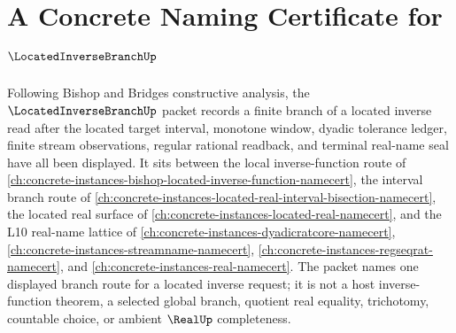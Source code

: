 \chapter{A Concrete Naming Certificate for $\LocatedInverseBranchUp$}
\label{ch:concrete-instances-located-inverse-branch-namecert}

Following Bishop and Bridges constructive analysis, the $\LocatedInverseBranchUp$ packet records a finite branch of a located inverse read after the located target interval, monotone window, dyadic tolerance ledger, finite stream observations, regular rational readback, and terminal real-name seal have all been displayed. It sits between the local inverse-function route of \autoref{ch:concrete-instances-bishop-located-inverse-function-namecert}, the interval branch route of \autoref{ch:concrete-instances-located-real-interval-bisection-namecert}, the located real surface of \autoref{ch:concrete-instances-located-real-namecert}, and the L10 real-name lattice of \autoref{ch:concrete-instances-dyadicratcore-namecert}, \autoref{ch:concrete-instances-streamname-namecert}, \autoref{ch:concrete-instances-regseqrat-namecert}, and \autoref{ch:concrete-instances-real-namecert}. The packet names one displayed branch route for a located inverse request; it is not a host inverse-function theorem, a selected global branch, quotient real equality, trichotomy, countable choice, or ambient $\RealUp$ completeness.

